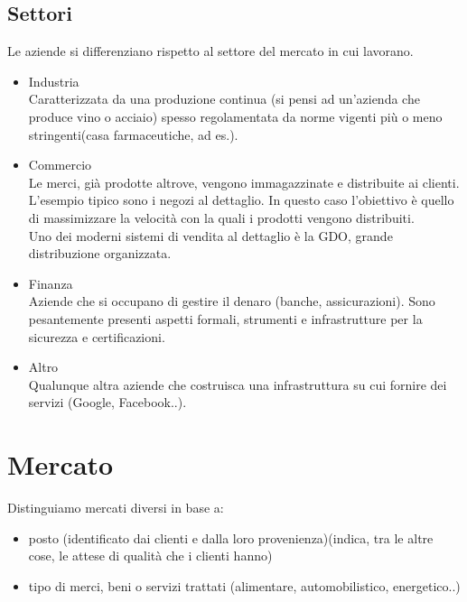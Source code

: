 \subsection{Settori}
Le aziende si differenziano rispetto al settore del mercato in cui lavorano.
\begin{itemize}
\item Industria \\
			Caratterizzata da una produzione continua (si pensi ad un'azienda che produce vino o acciaio) spesso regolamentata da norme vigenti pi\`u o meno stringenti(casa farmaceutiche, ad es.).
\item Commercio \\
			Le merci, gi\`a prodotte altrove, vengono immagazzinate e distribuite ai clienti. L'esempio tipico sono i negozi al dettaglio. In questo caso l'obiettivo \`e quello di massimizzare la velocit\`a con la quali i prodotti vengono distribuiti. \\
Uno dei moderni sistemi di vendita al dettaglio \`e la \textsf{GDO}, grande distribuzione organizzata.
\item Finanza \\
			Aziende che si occupano di gestire il denaro (banche, assicurazioni). Sono pesantemente presenti aspetti formali, strumenti e infrastrutture per la sicurezza e certificazioni.
\item Altro \\
			Qualunque altra aziende che costruisca una infrastruttura su cui fornire dei servizi (Google, Facebook..).
\end{itemize}

\section{Mercato}
Distinguiamo mercati diversi in base a:
\begin{itemize}
\item posto (identificato dai clienti e dalla loro provenienza)(indica, tra le altre cose, le attese di qualit\`a che i clienti hanno)
\item tipo di merci, beni o servizi trattati (alimentare, automobilistico, energetico..)
\end{itemize}

